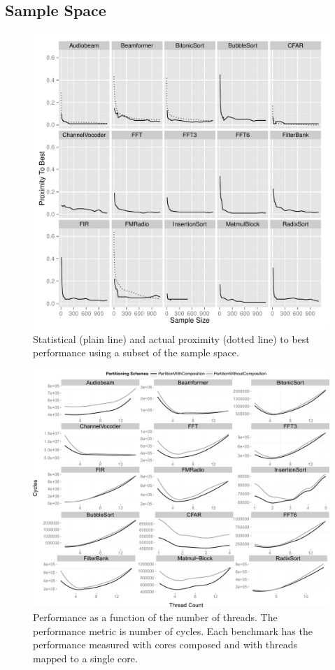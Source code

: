 \subsection{Sample Space}

\begin{figure}[h]
  \centering
    \includegraphics[width=1\textwidth]{streamit-paper/graphics/ESCProx.pdf}
    \caption{Statistical (plain line) and actual proximity (dotted line) to best performance using a subset of the sample space.}\label{fig:prox}
\end{figure}

\begin{figure}[h]
 \centering
    \includegraphics[width=1\textwidth]{streamit-paper/graphics/threadingmaybe2.pdf}
    \caption{Performance as a function of the number of threads. The performance metric is number of cycles. Each benchmark has the performance measured with cores composed and with threads mapped to a single core.}\label{fig:threadtrend}
\end{figure}

